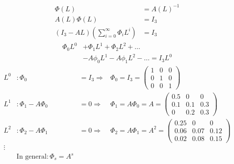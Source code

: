 \documentclass[a4paper]{scrartcl}
\begin{document}
\begin{enumerate}
\begin{solution}
		\begin{align*}
		\Phi(L) &= A(L)^{-1}\\
		A(L) \Phi(L) &= I_3\\
		(I_3 - A L) \left(\sum_{i=0}^\infty \Phi_i L^i\right) &= I_3
		\end{align*}
		\begin{align*}
		\Phi_0 L^0 &+ \Phi_1 L^1 + \Phi_2 L^2 + \dots \\
		& - A \phi_0 L^1 - A \phi_1 L^2 - \dots = I_3 L^0
		\end{align*}
		\begin{align}
		L^0&: \Phi_0 &= I_3 \Rightarrow& \Phi_0 = I_3 = \begin{pmatrix}1&0&0\\0&1&0\\0&0&1 \end{pmatrix}\nonumber\\
		L^1&: \Phi_1 - A \Phi_0 &= 0 \Rightarrow& \Phi_1 = A \Phi_0 = A = \begin{pmatrix}0.5&0&0\\0.1&0.1&0.3\\0&0.2&0.3 \end{pmatrix}\nonumber\\
		L^2&: \Phi_2 - A \Phi_1 &= 0 \Rightarrow& \Phi_2 = A \Phi_1 = A^2 = \begin{pmatrix}0.25&0&0\\0.06&0.07&0.12\\0.02&0.08&0.15 \end{pmatrix}\nonumber\\
		\vdots\nonumber\\
		&\text{In general}: \Phi_s = A^s \label{allg}
		\end{align}
\end{solution}
\end{enumerate}


\newpage
\end{document}
